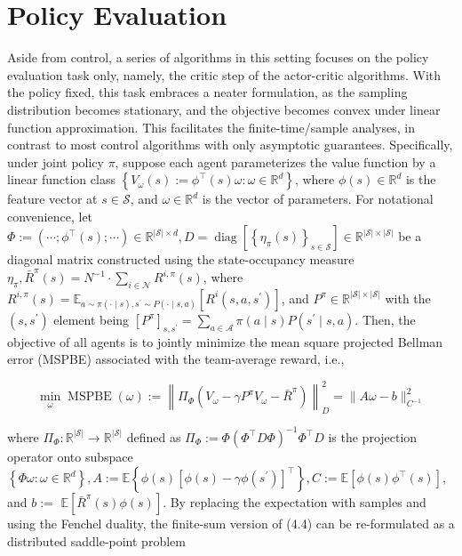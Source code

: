 \documentclass[10pt]{article}
\begin{document}
\section{Policy Evaluation}
Aside from control, a series of algorithms in this setting focuses on the policy evaluation task only, namely, the critic step of the actor-critic algorithms. With the policy fixed, this task embraces a neater formulation, as the sampling distribution becomes stationary, and the objective becomes convex under linear function approximation. This facilitates the finite-time/sample analyses, in contrast to most control algorithms with only asymptotic guarantees. Specifically, under joint policy $\pi$, suppose each agent parameterizes the value function by a linear function class $\left\{V_{\omega}(s):=\phi^{\top}(s) \omega: \omega \in \mathbb{R}^{d}\right\}$, where $\phi(s) \in \mathbb{R}^{d}$ is the feature vector at $s \in \mathcal{S}$, and $\omega \in \mathbb{R}^{d}$ is the vector of parameters. For notational convenience, let $\Phi:=\left(\cdots ; \phi^{\top}(s) ; \cdots\right) \in \mathbb{R}^{|\mathcal{S}| \times d}, D=\operatorname{diag}\left[\left\{\eta_{\pi}(s)\right\}_{s \in \mathcal{S}}\right] \in \mathbb{R}^{|\mathcal{S}| \times|\mathcal{S}|}$ be a diagonal matrix constructed using the state-occupancy measure $\eta_{\pi}, \bar{R}^{\pi}(s)=N^{-1} \cdot \sum_{i \in \mathcal{N}} R^{i, \pi}(s)$, where $R^{i, \pi}(s)=\mathbb{E}_{a \sim \pi(\cdot \mid s), s^{\prime} \sim P(\cdot \mid s, a)}\left[R^{i}\left(s, a, s^{\prime}\right)\right]$, and $P^{\pi} \in \mathbb{R}^{|\mathcal{S}| \times|\mathcal{S}|}$ with the $\left(s, s^{\prime}\right)$ element being $\left[P^{\pi}\right]_{s, s^{\prime}}=\sum_{a \in \mathcal{A}} \pi(a \mid s) P\left(s^{\prime} \mid s, a\right)$. Then, the objective of all agents is to jointly minimize the mean square projected Bellman error (MSPBE) associated with the team-average reward, i.e.,

\[
\min _{\omega} \operatorname{MSPBE}(\omega):=\left\|\Pi_{\Phi}\left(V_{\omega}-\gamma P^{\pi} V_{\omega}-\bar{R}^{\pi}\right)\right\|_{D}^{2}=\|A \omega-b\|_{C^{-1}}^{2}
\]

where $\Pi_{\Phi}: \mathbb{R}^{|\mathcal{S}|} \rightarrow \mathbb{R}^{|\mathcal{S}|}$ defined as $\Pi_{\Phi}:=\Phi\left(\Phi^{\top} D \Phi\right)^{-1} \Phi^{\top} D$ is the projection operator onto subspace $\left\{\Phi \omega: \omega \in \mathbb{R}^{d}\right\}, A:=\mathbb{E}\left\{\phi(s)\left[\phi(s)-\gamma \phi\left(s^{\prime}\right)\right]^{\top}\right\}, C:=\mathbb{E}\left[\phi(s) \phi^{\top}(s)\right]$, and $b:=$ $\mathbb{E}\left[\bar{R}^{\pi}(s) \phi(s)\right]$. By replacing the expectation with samples and using the Fenchel duality, the finite-sum version of (4.4) can be re-formulated as a distributed saddle-point problem
\end{document}
